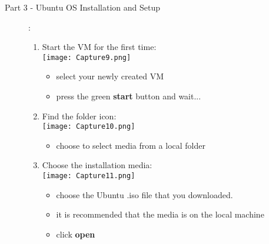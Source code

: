 \documentclass[12pt]{article}
\begin{document}
\begin{description}
\begin{description}
\item[Part 3 - Ubuntu OS Installation and Setup]: \vspace{5mm} \\

\begin{enumerate}[label=\alph*)] 
\item Start the VM for the first time: \vspace{5mm} \\
      		\hspace*{-2.5cm}\texttt{[image: Capture9.png]}\\
            \begin{itemize}
                    
                 \item select your newly created VM      
                 \item press the green {\bf start} button and wait...
     
            \end{itemize}
\vspace{10mm}
\item Find the folder icon: \vspace{5mm} \\
      		\hspace*{-2.5cm}\texttt{[image: Capture10.png]}\\
            \begin{itemize}
                    
                 \item choose to select media from a local folder 
                 
            \end{itemize}

\newpage	
\item Choose the installation media: \vspace{5mm} \\
      		\hspace*{-2.5cm}\texttt{[image: Capture11.png]} \\
               \begin{itemize}
                    
     
                \item choose the Ubuntu .iso file that you downloaded.
                \item it is recommended that the media is on the local machine
                \item click {\bf open}
                

\end{itemize}
\end{enumerate}
\end{description}
\end{description}
\end{document}
